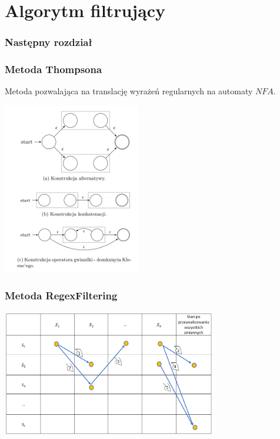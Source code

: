 \documentclass{beamer}
\begin{document}
    \section{Algorytm filtrujący}
    \begin{frame}
		\frametitle{Następny rozdział}
        \tableofcontents[currentsection]
    \end{frame}
    \begin{frame}
        \frametitle{Metoda Thompsona}
        Metoda pozwalająca na translację wyrażeń regularnych na automaty $NFA$.
        \begin{center}
            \includegraphics[width=0.45\textwidth]{thompson.png}
        \end{center}
    \end{frame}
    \begin{frame}
        \frametitle{Metoda RegexFiltering}
        \begin{center}
            \includegraphics[width=0.7\textwidth]{regex_filtering.png}
        \end{center}
    \end{frame}
\end{document}
